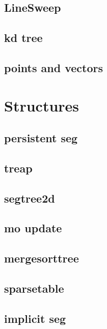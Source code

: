 \subsection{LineSweep}
\raggedbottom
\hrulefill
\subsection{kd tree}
\raggedbottom
\hrulefill
\subsection{points and vectors}
\raggedbottom
\hrulefill

\section{Structures}
\subsection{persistent seg}
\raggedbottom
\hrulefill
\subsection{treap}
\raggedbottom
\hrulefill
\subsection{segtree2d}
\raggedbottom
\hrulefill
\subsection{mo update}
\raggedbottom
\hrulefill
\subsection{mergesorttree}
\raggedbottom
\hrulefill
\subsection{sparsetable}
\raggedbottom
\hrulefill
\subsection{implicit seg}
\raggedbottom
\hrulefill
